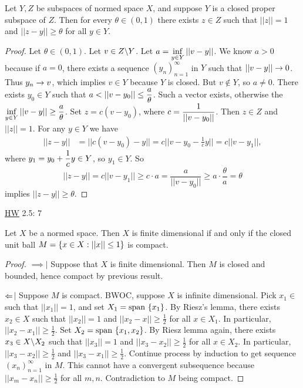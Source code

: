 \documentclass[]{article}
\begin{document}
\begin{theorem}
	Let $Y,Z$ be subspaces of normed space $X$, and suppose $Y$ is a closed proper subspace of $Z$.
	Then for every $\theta\in(0,1)$ there exists $z\in Z$ such that $||z||=1$ and $||z-y||\geq\theta$ for all $y\in Y$.
\end{theorem}
\begin{proof}
	Let $\theta\in(0,1)$. Let $v\in Z\backslash Y$. Let $\displaystyle a = \inf_{y\in Y}||v-y||$.
	We know $a>0$ because if $a=0$, there exists a sequence $(y_n)_{n=1}^\infty$ in $Y$ such that $||v-y||\rightarrow0$. 
	Thus $y_n\rightarrow v$, which implies $v\in Y$ because $Y$ is closed. But $v\notin Y$, so $a\neq 0$.
	There exists $y_0\in Y$ such that $\ds a<||v-y_0||\leq \frac a\theta$.
	Such a vector exists, otherwise the $\displaystyle \inf_{y\in Y}||v-y||\geq \frac a\theta$.
	Set $z = c(v-y_0)$, where $\displaystyle c=\frac1{||v-y_0||}$.
	Then $z\in Z$ and $||z||=1$.
	For any $y\in Y$ we have 
	\begin{align*}
		||z-y|| &= ||c(v-y_0)-y||
				= c||v-y_0-\frac1cy||
				= c||v-y_1||,
	\end{align*}
	where $\displaystyle y_1 = y_0+\frac1cy\in Y$, so $y_1\in Y$.
	So
		$$||z-y|| = c||v-y_1|| 
				\geq c\cdot a 
				= \frac a{||v-y_0||} 
				\geq a\cdot\frac\theta a = \theta$$
	implies $||z-y||\geq\theta$.
\end{proof}
\ul{HW} 2.5: 7

\begin{theorem}
	Let $X$ be a normed space. Then $X$ is finite dimensional if and only if the closed unit ball $M = \left\{ x\in X : ||x||\leq 1 \right\}$ is compact.
\end{theorem}
\begin{proof}
	\ul{$\implies$}$\mid$ Suppose that $X$ is finite dimensional.
	Then $M$ is closed and bounded, hence compact by previous result.

	\ul{$\Leftarrow$}$\mid$ Suppose $M$ is compact. BWOC, suppose $X$ is infinite dimensional.
	Pick $x_1\in $ such that $||x_1||=1$, and set $X_1=\text{span}\,\left\{ x_1 \right\}$.
	By Riesz's lemma, there exists $x_2\in X$ such that $||x_2||=1$ and $||x_2-x||\geq\frac12$ for all $x\in X_1$.
	In particular, $||x_2-x_1||\geq\frac12$.
	Set $X_2 = \text{span}\,\left\{ x_1,x_2 \right\}$.
	By Riesz lemma again, there exists $x_3\in X\backslash X_2$ such that $||x_3||=1$ and $||x_3-x_2||\geq\frac12$ for all $x\in X_2$.
	In particular, $||x_3-x_2||\geq\frac12$ and $||x_3-x_1||\geq\frac12$.
	Continue process by induction to get sequence $(x_n)_{n=1}^\infty$ in $M$.
	This cannot have a convergent subsequence because $||x_m-x_n||\geq\frac12$ for all $m,n$.
	Contradiction to $M$ being compact.
\end{proof}
\end{document}

